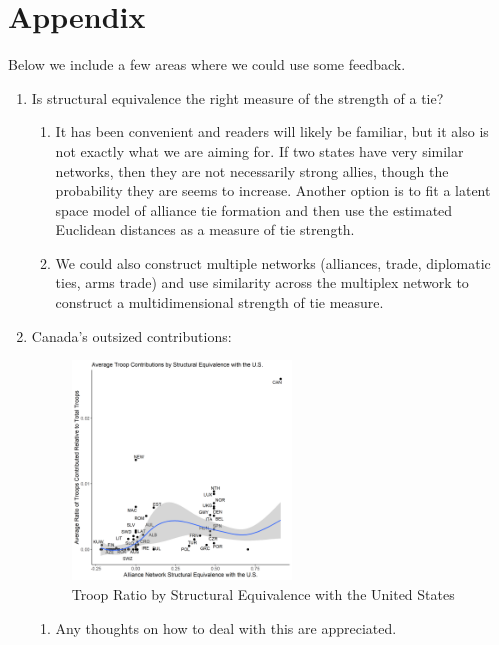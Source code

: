 \newpage
\section{Appendix}

Below we include a few areas where we could use some feedback.

\begin{enumerate}

	\item Is structural equivalence the right measure of the strength of a tie?
		\begin{enumerate}
			\item It has been convenient and readers will likely be familiar, but it also is not exactly what we are aiming for. If two states have very similar networks, then they are not necessarily strong allies, though the probability they are seems to increase. Another option is to fit a latent space model of alliance tie formation \citep{hoff2002} and then use the estimated Euclidean distances as a measure of tie strength.
			\item We could also construct multiple networks (alliances, trade, diplomatic ties, arms trade) and use similarity across the multiplex network to construct a multidimensional strength of tie measure.
		\end{enumerate}
	\item Canada's outsized contributions:
			\begin{figure}[H]
			\centering
				\includegraphics[width=0.55\textwidth]{figures/contributions_canada.png}
			\caption{Troop Ratio by Structural Equivalence with the United States}
			\label{fig:contr_sequiv_can}
			\end{figure}

		\begin{enumerate}
			\item Any thoughts on how to deal with this are appreciated.
		\end{enumerate}



\end{enumerate}
